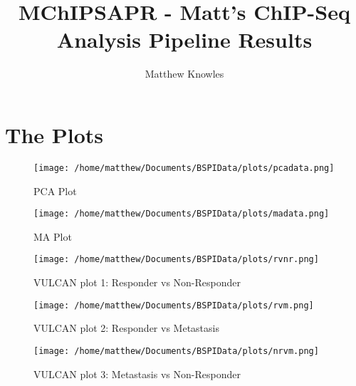 \documentclass{article}
\title{MChIPSAPR - Matt's ChIP-Seq Analysis Pipeline Results}
\author{Matthew Knowles}
\begin{document}
\maketitle

\section{The Plots}

\begin{figure}[h]
\centering
\caption{PCA Plot}
\texttt{[image: /home/matthew/Documents/BSPIData/plots/pcadata.png]}
\end{figure}

\newpage

\begin{figure}[h]
\centering
\caption{MA Plot}
\texttt{[image: /home/matthew/Documents/BSPIData/plots/madata.png]}
\end{figure}

\newpage

\begin{figure}[h]
\centering
\caption{VULCAN plot 1: Responder vs Non-Responder}
\texttt{[image: /home/matthew/Documents/BSPIData/plots/rvnr.png]}
\end{figure}

\begin{figure}[h]
\centering
\caption{VULCAN plot 2: Responder vs Metastasis}
\texttt{[image: /home/matthew/Documents/BSPIData/plots/rvm.png]}
\end{figure}

\begin{figure}[h]
\centering
\caption{VULCAN plot 3: Metastasis vs Non-Responder}
\texttt{[image: /home/matthew/Documents/BSPIData/plots/nrvm.png]}
\end{figure}
\end{document}
